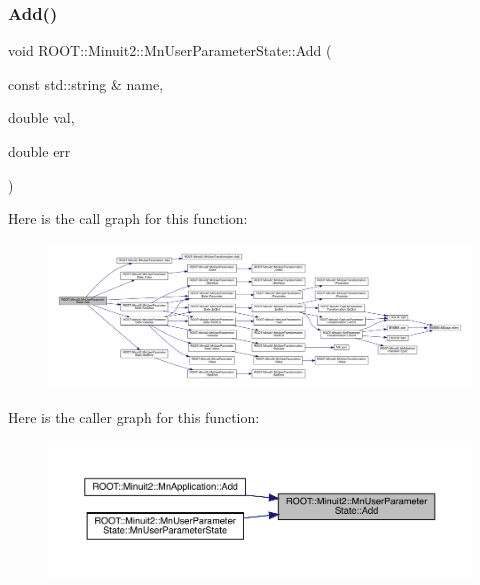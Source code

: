 \subsubsection{\texorpdfstring{Add()}{Add()}\hspace{0.1cm}{\footnotesize\ttfamily [1/9]}}
{\footnotesize\ttfamily void R\+O\+O\+T\+::\+Minuit2\+::\+Mn\+User\+Parameter\+State\+::\+Add (\begin{DoxyParamCaption}\item[{const std\+::string \&}]{name,  }\item[{double}]{val,  }\item[{double}]{err }\end{DoxyParamCaption})}

Here is the call graph for this function\+:
\nopagebreak
\begin{figure}[H]
\begin{center}
\leavevmode
\includegraphics[width=350pt]{d3/de0/classROOT_1_1Minuit2_1_1MnUserParameterState_a958abf8c6542ba9be16e298ad2b63001_cgraph}
\end{center}
\end{figure}
Here is the caller graph for this function\+:
\nopagebreak
\begin{figure}[H]
\begin{center}
\leavevmode
\includegraphics[width=350pt]{d3/de0/classROOT_1_1Minuit2_1_1MnUserParameterState_a958abf8c6542ba9be16e298ad2b63001_icgraph}
\end{center}
\end{figure}
\mbox{\label{classROOT_1_1Minuit2_1_1MnUserParameterState_a958abf8c6542ba9be16e298ad2b63001}} 
